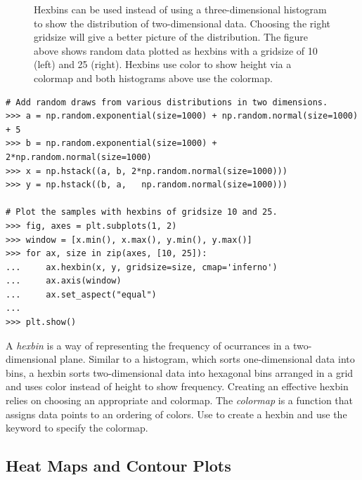 \begin{figure}[H]
\begin{subfigure}{.47\textwidth}
    \end{subfigure}
    \caption{Hexbins can be used instead of using a three-dimensional histogram to show the distribution of two-dimensional data. Choosing the right gridsize will give a better picture of the distribution. The figure above shows random data plotted as hexbins with a gridsize of 10 (left) and 25 (right). Hexbins use color to show height via a colormap and both histograms above use the  colormap.}
    \label{fig:scatter_hexbin}
\end{figure}

\begin{lstlisting}
# Add random draws from various distributions in two dimensions.
>>> a = np.random.exponential(size=1000) + np.random.normal(size=1000) + 5
>>> b = np.random.exponential(size=1000) + 2*np.random.normal(size=1000)
>>> x = np.hstack((a, b, 2*np.random.normal(size=1000)))
>>> y = np.hstack((b, a,   np.random.normal(size=1000)))

# Plot the samples with hexbins of gridsize 10 and 25.
>>> fig, axes = plt.subplots(1, 2)
>>> window = [x.min(), x.max(), y.min(), y.max()]
>>> for ax, size in zip(axes, [10, 25]):
...     ax.hexbin(x, y, gridsize=size, cmap='inferno')
...     ax.axis(window)
...     ax.set_aspect("equal")
...
>>> plt.show()
\end{lstlisting}

A \emph{hexbin} is a way of representing the frequency of ocurrances in a two-dimensional plane.
Similar to a histogram, which sorts one-dimensional data into bins, a hexbin sorts two-dimensional data into hexagonal bins arranged in a grid and uses color instead of height to show frequency.
Creating an effective hexbin relies on choosing an appropriate  and colormap.
The \emph{colormap} is a function that assigns data points to an ordering of colors.
Use  to create a hexbin and use the  keyword to specify the colormap.

\subsection*{Heat Maps and Contour Plots} %


